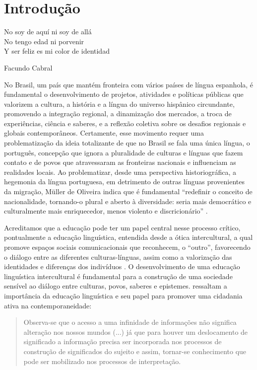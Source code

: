 \documentclass[portuguese]{textolivre}
\begin{document}
\section{Introdução}\label{sec-intro}

\epigraph{No soy de aquí ni soy de allá \\ 
No tengo edad ni porvenir \\ 
Y ser feliz es mi color de identidad}{Facundo Cabral}

No Brasil, um país que mantém fronteira com vários países de língua espanhola, é fundamental o desenvolvimento de projetos, atividades e políticas públicas que valorizem a cultura, a história e a língua do universo hispânico circundante, promovendo a integração regional, a dinamização dos mercados, a troca de experiências, ciência e saberes, e a reflexão coletiva sobre os desafios regionais e globais contemporâneos. Certamente, esse movimento requer uma problematização da ideia totalizante de que no Brasil se fala uma única língua, o português, concepção que ignora a pluralidade de culturas e línguas que fazem contato e de povos que atravessaram as fronteiras nacionais e influenciam as realidades locais. Ao problematizar, desde uma perspectiva historiográfica, a hegemonia da língua portuguesa, em detrimento de outras línguas provenientes da migração, Müller de Oliveira indica que é fundamental “redefinir o conceito de nacionalidade, tornando-o plural e aberto à diversidade: seria mais democrático e culturalmente mais enriquecedor, menos violento e discricionário” \cite[p.9]{oliveira2008}.

Acreditamos que a educação pode ter um papel central nesse processo crítico, pontualmente a educação linguística, entendida desde a ótica intercultural, a qual promove espaços sociais comunicacionais que reconhecem, o “outro”, favorecendo o diálogo entre as diferentes culturas-línguas, assim como a valorização das identidades e diferenças dos indivíduos \cite{fleuri2001desafios}. O desenvolvimento de uma educação linguística intercultural é fundamental para a construção de uma sociedade sensível ao diálogo entre culturas, povos, saberes e epistemes. \textcite[p.24-25]{takaki_repensando_2019} ressaltam a importância da educação linguística e seu papel para promover uma cidadania ativa na contemporaneidade:

\begin{quote}
 Observa-se que o acesso a uma infinidade de informações não significa alteração nos nossos mundos (...) já que para houver um deslocamento de significado a informação precisa ser incorporada nos processos de construção de significados do sujeito e assim, tornar-se conhecimento que pode ser mobilizado nos processos de interpretação. 
\end{quote}
\end{document}
